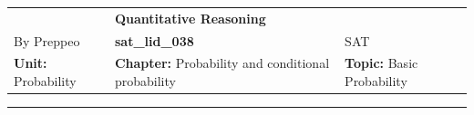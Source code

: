 \documentclass[11pt,paper=a4,answers]{exam}
\begin{document}
\begin{center}
    \centering
    \renewcommand{\arraystretch}{1.5}
    \begin{tabularx}{\textwidth}{YYY}
    & \normalsize\bf{{\Large{{Quantitative Reasoning}}}} & \\
    By Preppeo & \normalsize\bf{{sat\_lid\_038}} & SAT\\
    \normalsize{{\textbf{{Unit:}} Probability}} & \normalsize{{\textbf{{Chapter:}} Probability and conditional probability}} & \normalsize{{\textbf{{Topic:}} Basic Probability}} \\
    \end{tabularx}
\end{center}
\par\noindent\rule{\textwidth}{1pt}
\end{document}
